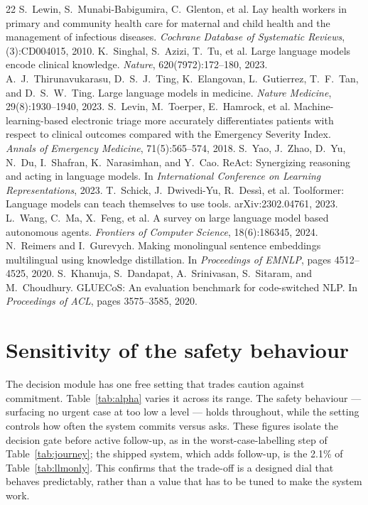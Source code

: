\documentclass[11pt]{article}
\begin{document}
\begin{thebibliography}{22}
 S.~Lewin, S.~Munabi-Babigumira, C.~Glenton, et al. Lay health workers in primary and community
health care for maternal and child health and the management of infectious diseases. \emph{Cochrane Database
of Systematic Reviews}, (3):CD004015, 2010.
 K.~Singhal, S.~Azizi, T.~Tu, et al. Large language models encode clinical knowledge.
\emph{Nature}, 620(7972):172--180, 2023.
 A.~J.~Thirunavukarasu, D.~S.~J.~Ting, K.~Elangovan, L.~Gutierrez, T.~F.~Tan, and
D.~S.~W.~Ting. Large language models in medicine. \emph{Nature Medicine}, 29(8):1930--1940, 2023.
 S.~Levin, M.~Toerper, E.~Hamrock, et al. Machine-learning-based electronic triage more
accurately differentiates patients with respect to clinical outcomes compared with the Emergency Severity
Index. \emph{Annals of Emergency Medicine}, 71(5):565--574, 2018.
 S.~Yao, J.~Zhao, D.~Yu, N.~Du, I.~Shafran, K.~Narasimhan, and Y.~Cao. ReAct: Synergizing
reasoning and acting in language models. In \emph{International Conference on Learning Representations}, 2023.
 T.~Schick, J.~Dwivedi-Yu, R.~Dess\`i, et al. Toolformer: Language models can teach
themselves to use tools. arXiv:2302.04761, 2023.
 L.~Wang, C.~Ma, X.~Feng, et al. A survey on large language model based autonomous
agents. \emph{Frontiers of Computer Science}, 18(6):186345, 2024.
 N.~Reimers and I.~Gurevych. Making monolingual sentence embeddings multilingual using
knowledge distillation. In \emph{Proceedings of EMNLP}, pages 4512--4525, 2020.
 S.~Khanuja, S.~Dandapat, A.~Srinivasan, S.~Sitaram, and M.~Choudhury. GLUECoS: An evaluation
benchmark for code-switched NLP. In \emph{Proceedings of ACL}, pages 3575--3585, 2020.
\end{thebibliography}

\clearpage
\appendix
\renewcommand{\thetable}{A\arabic{table}}
\setcounter{table}{0}

\section{Sensitivity of the safety behaviour}
\label{app:sensitivity}
The decision module has one free setting that trades caution against commitment. Table~\ref{tab:alpha} varies
it across its range. The safety behaviour --- surfacing no urgent case at too low a level --- holds throughout,
while the setting controls how often the system commits versus asks. These figures isolate the decision gate
before active follow-up, as in the worst-case-labelling step of Table~\ref{tab:journey}; the shipped system,
which adds follow-up, is the 2.1\% of Table~\ref{tab:llmonly}. This confirms that the trade-off is a
designed dial that behaves predictably, rather than a value that has to be tuned to make the system work.
\end{document}
